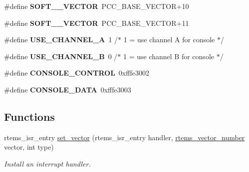 \begin{DoxyCompactItemize}
\mbox{\label{group__RTEMSBSPsM68kMVME147_gae7a8712d92352bdfb75ced3209ae2095}} 
\#define {\bfseries S\+O\+F\+T\+\_\+\_\+\+V\+E\+C\+T\+OR}~P\+C\+C\+\_\+\+B\+A\+S\+E\+\_\+\+V\+E\+C\+T\+OR+10
\item 
\mbox{\label{group__RTEMSBSPsM68kMVME147_ga27b5de1dbca6220daf904d4d3730d66e}} 
\#define {\bfseries S\+O\+F\+T\+\_\+\_\+\+V\+E\+C\+T\+OR}~P\+C\+C\+\_\+\+B\+A\+S\+E\+\_\+\+V\+E\+C\+T\+OR+11
\item 
\mbox{\label{group__RTEMSBSPsM68kMVME147_ga62d3e1ecd14b8482d9bd5a0560371bc2}} 
\#define {\bfseries U\+S\+E\+\_\+\+C\+H\+A\+N\+N\+E\+L\+\_\+A}~1                /$\ast$ 1 = use channel A for console $\ast$/
\item 
\mbox{\label{group__RTEMSBSPsM68kMVME147_ga4a14f6ceda7efc6e5701d1525acf09d0}} 
\#define {\bfseries U\+S\+E\+\_\+\+C\+H\+A\+N\+N\+E\+L\+\_\+B}~0                /$\ast$ 1 = use channel B for console $\ast$/
\item 
\mbox{\label{group__RTEMSBSPsM68kMVME147_ga35de1b31d83ed28bc0050d3114543aab}} 
\#define {\bfseries C\+O\+N\+S\+O\+L\+E\+\_\+\+C\+O\+N\+T\+R\+OL}~0xfffe3002
\item 
\mbox{\label{group__RTEMSBSPsM68kMVME147_gaa81c81c37b7889031099b9ff7d3c0a60}} 
\#define {\bfseries C\+O\+N\+S\+O\+L\+E\+\_\+\+D\+A\+TA}~0xfffe3003
\end{DoxyCompactItemize}
\subsection*{Functions}
\begin{DoxyCompactItemize}
\item 
rtems\+\_\+isr\+\_\+entry \mbox{\hyperlink{group__RTEMSBSPsM68kMVME147_gab3388042c56b34c40be81fd5f028d97e}{set\+\_\+vector}} (rtems\+\_\+isr\+\_\+entry handler, \mbox{\hyperlink{group__ClassicINTR_ga3e434c197d99f128e78cae4d9358bd8b}{rtems\+\_\+vector\+\_\+number}} vector, int type)
\begin{DoxyCompactList}\small\item\em Install an interrupt handler. \end{DoxyCompactList}\end{DoxyCompactItemize}
